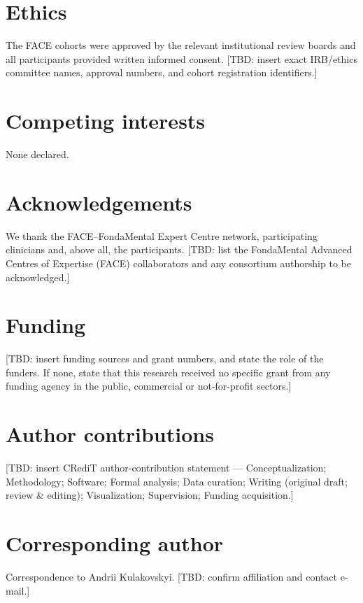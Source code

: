 \section*{Ethics}
The FACE cohorts were approved by the relevant institutional review boards and all
participants provided written informed consent. [TBD: insert exact IRB/ethics
committee names, approval numbers, and cohort registration identifiers.]

\section*{Competing interests}
None declared.

\section*{Acknowledgements}
We thank the FACE--FondaMental Expert Centre network, participating clinicians and,
above all, the participants. [TBD: list the FondaMental Advanced Centres of
Expertise (FACE) collaborators and any consortium authorship to be acknowledged.]

\section*{Funding}
[TBD: insert funding sources and grant numbers, and state the role of the funders.
If none, state that this research received no specific grant from any funding agency
in the public, commercial or not-for-profit sectors.]

\section*{Author contributions}
[TBD: insert CRediT author-contribution statement --- Conceptualization; Methodology;
Software; Formal analysis; Data curation; Writing (original draft; review \& editing);
Visualization; Supervision; Funding acquisition.]

\section*{Corresponding author}
Correspondence to Andrii Kulakovskyi. [TBD: confirm affiliation and contact e-mail.]
